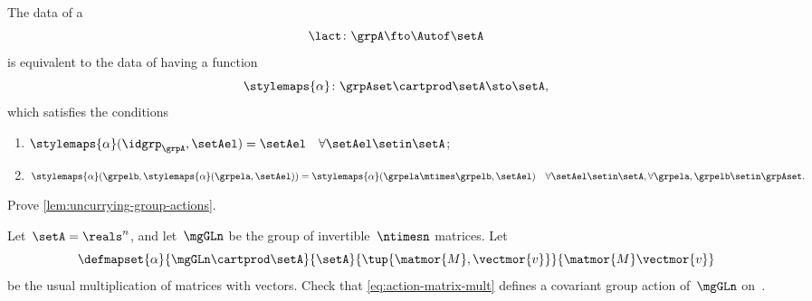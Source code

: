 \begin{lemma}
    \label{lem:uncurrying-group-actions}
    The data of a 
    \begin{equation}
        \lact \colon \grpA \fto \Autof\setA
    \end{equation}
    is equivalent to the data of having a function
    \begin{equation}
        \stylemaps{\alpha} \colon \grpAset \cartprod \setA \sto \setA,
    \end{equation}
    which satisfies the conditions
    \begin{enumerate}
        \item $ \stylemaps{\alpha} (\idgrp_\grpA, \setAel) = \setAel \quad \forall \setAel \setin \setA$;
        \item $ \stylemaps{\alpha} (\grpelb, \stylemaps{\alpha}(\grpela, \setAel)) = \stylemaps{\alpha} (\grpela \mtimes \grpelb, \setAel) \quad \forall \setAel \setin \setA, \forall \grpela, \grpelb \setin \grpAset.
              $
    \end{enumerate}
\end{lemma}

\vfill%


\begin{gradedexercise}
    \label{ex:UncurryingGroupActions}
    Prove \cref{lem:uncurrying-group-actions}.
\end{gradedexercise}

\begin{gradedexercise}
    \label{ex:MatrixMultAction}
    Let~$\setA = \reals^n$, and let~$\mgGLn$ be the group of invertible~$\ntimesn$ matrices.
    Let
    \begin{equation}
        \label{eq:action-matrix-mult}
        \defmapset{
            \alpha
        }{
            \mgGLn \cartprod \setA
        }{
            \setA
        }{
            \tup{\matmor{M}, \vectmor{v}}
        }{
            \matmor{M}\vectmor{v}
        }
    \end{equation}
    be the usual multiplication of matrices with vectors.
    Check that \cref{eq:action-matrix-mult} defines a covariant group action of~$\mgGLn$ on~\setA.
\end{gradedexercise}


